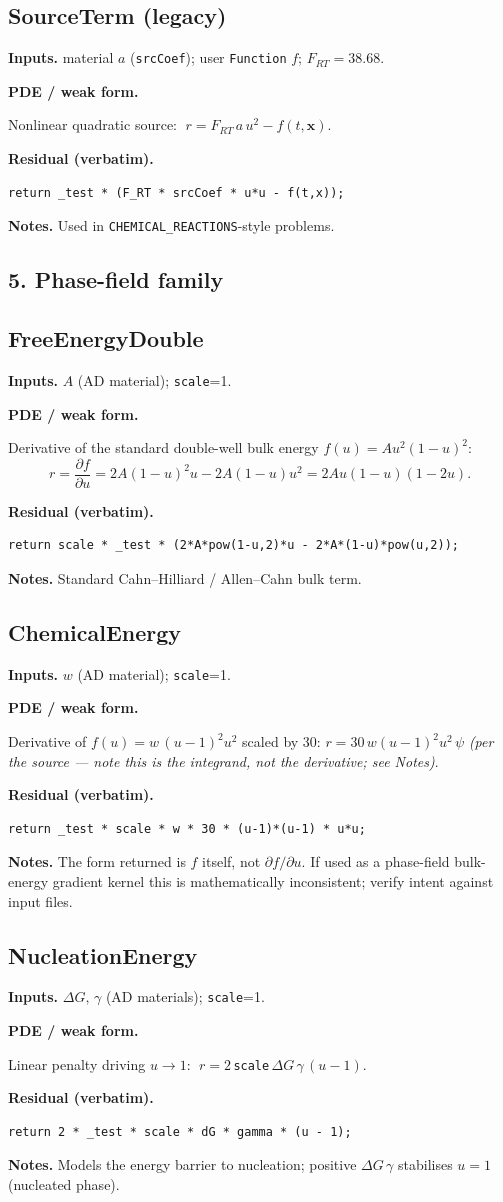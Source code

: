 \documentclass[11pt]{article}
\newenvironment{ecmEntry}[1]{%
  \subsection{#1}%
}{}
\newcommand{\inputsRow}[1]{\par\noindent\textbf{Inputs.} #1\par}
\newcommand{\pdeRow}[1]{\par\noindent\textbf{PDE / weak form.}\par #1\par}
\newcommand{\codeRow}{\par\noindent\textbf{Residual (verbatim).}\par}
\newcommand{\notesRow}[1]{\par\noindent\textbf{Notes.} #1\par}
\begin{document}
\begin{ecmEntry}{SourceTerm (legacy)}
\inputsRow{material $a$ (\texttt{srcCoef}); user \texttt{Function} $f$; $F_{RT}=38.68$.}
\pdeRow{Nonlinear quadratic source: $\;r=F_{RT}\,a\,u^2 - f(t,\mathbf{x})$.}
\codeRow\begin{lstlisting}
return _test * (F_RT * srcCoef * u*u - f(t,x));
\end{lstlisting}
\notesRow{Used in \texttt{CHEMICAL\_REACTIONS}-style problems.}
\end{ecmEntry}

\subsection*{5. Phase-field family}

\begin{ecmEntry}{FreeEnergyDouble}
\inputsRow{$A$ (AD material); \texttt{scale}=1.}
\pdeRow{Derivative of the standard double-well bulk energy
$f(u)=A u^2(1-u)^2$:
\[
  r = \frac{\partial f}{\partial u} = 2A(1-u)^2 u - 2A(1-u)u^2 = 2Au(1-u)(1-2u).
\]}
\codeRow\begin{lstlisting}
return scale * _test * (2*A*pow(1-u,2)*u - 2*A*(1-u)*pow(u,2));
\end{lstlisting}
\notesRow{Standard Cahn--Hilliard / Allen--Cahn bulk term.}
\end{ecmEntry}

\begin{ecmEntry}{ChemicalEnergy}
\inputsRow{$w$ (AD material); \texttt{scale}=1.}
\pdeRow{Derivative of $f(u)=w\,(u-1)^2 u^2$ scaled by $30$:
$r=30\,w(u-1)^2 u^2 \,\psi$ \emph{(per the source — note this is the integrand,
not the derivative; see Notes)}.}
\codeRow\begin{lstlisting}
return _test * scale * w * 30 * (u-1)*(u-1) * u*u;
\end{lstlisting}
\notesRow{The form returned is $f$ itself, not $\partial f/\partial u$. If used as a
phase-field bulk-energy gradient kernel this is mathematically inconsistent; verify
intent against input files.}
\end{ecmEntry}

\begin{ecmEntry}{NucleationEnergy}
\inputsRow{$\Delta G,\,\gamma$ (AD materials); \texttt{scale}=1.}
\pdeRow{Linear penalty driving $u\to 1$:
$\;r = 2\,$\texttt{scale}$\,\Delta G\,\gamma\,(u-1)$.}
\codeRow\begin{lstlisting}
return 2 * _test * scale * dG * gamma * (u - 1);
\end{lstlisting}
\notesRow{Models the energy barrier to nucleation; positive $\Delta G\,\gamma$ stabilises
$u=1$ (nucleated phase).}
\end{ecmEntry}
\end{document}
